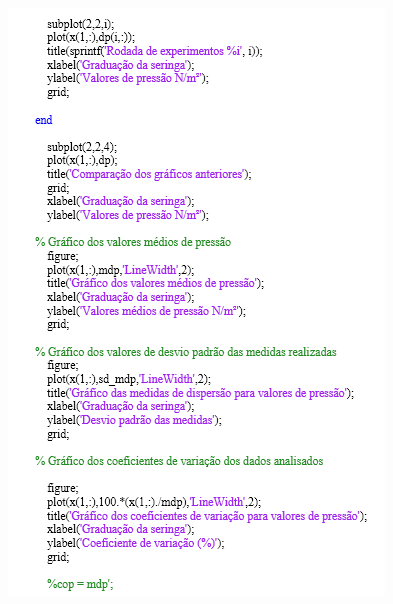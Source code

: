 \begin{apendicesenv}
\begin{figure}[H]
    \centering
      \includegraphics[scale=1.0]{figuras/rotina3.png}
    \label{rotina3}
\end{figure}




\end{apendicesenv}













